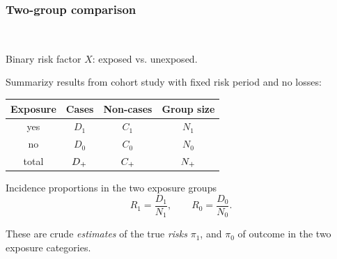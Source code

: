 \documentclass[handout,12pt]{beamer}
\begin{document}
\begin{frame}[fragile] \frametitle{Two-group comparison}
\ \\
\bi
\item Binary risk factor $X$: exposed vs. unexposed.
\item Summarizy results from cohort study with fixed risk period and no losses:
\begin{center}
\begin{tabular}{cccc}
\toprule
Exposure         &        Cases        &    Non-cases    &    Group size\\
\midrule
      yes        &             $D_{1}$ &        $C_{1}$  &    $N_{1}$  \\
      no         &            $D_{0}$  &        $C_{0}$  &    $N_{0}$\\
\midrule    
    total        &           $D_{\tiny +}$  &        $C_{\tiny +}$  &   $N_{\tiny +}$\\
\bottomrule
\end{tabular}
\end{center}
\item Incidence proportions in the two exposure groups
$$ R_1 = \frac{D_1}{N_1}, \qquad
   R_0 = \frac{D_0}{N_0} . $$ 
\item These are crude {\it estimates} of the true {\it risks} $\pi_{1}$, and $\pi_{0}$ of outcome in the two exposure categories.
\ei
\end{frame} 
\end{document}
